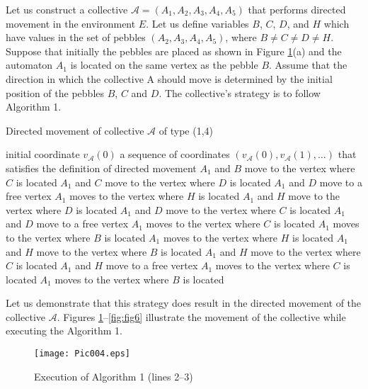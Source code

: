 \documentclass{article}
\newenvironment{proof}[1][Proof]{\begin{trivlist}
\item[\hskip \labelsep {\bfseries #1}]}{\end{trivlist}}
\begin{document}
\begin{proof}
Let us construct a collective $\mathcal{A} = \left( A_{1}, A_{2}, A_{3}, A_{4}, A_{5} \right)$ that performs directed movement in the environment $E$.
Let us define variables $B$, $C$, $D$, and $H$ which have values in the set of pebbles $\left( A_{2}, A_{3}, A_{4}, A_{5} \right)$, where $B \neq C \neq D \neq H$.
Suppose that initially the pebbles are placed as shown in Figure \ref{fig:fig4}(a) and the automaton $A_{1}$ is located on the same vertex as the pebble $B$. 
Assume that the direction in which the collective A should move is determined by the initial position of the pebbles $B$, $C$ and $D$. 
The collective's strategy is to follow Algorithm 1.

\begin{algorithm}
\caption{Directed movement of collective $\mathcal{A}$ of type (1,4)}
\begin{algorithmic}[1]
\Require initial coordinate $v_{\mathcal{A}}(0)$
\Ensure a sequence of coordinates $\left( v_{\mathcal{A}}(0), v_{\mathcal{A}}(1), \dots \right)$ that satisfies the definition of directed movement
\Statex
\Loop
\State $A_{1}$ and $B$ move to the vertex where $C$ is located
\State $A_{1}$ and $C$ move to the vertex where $D$ is located
\State $A_{1}$ and $D$ move to a free vertex
\State $A_{1}$ moves to the vertex where $H$ is located
\State $A_{1}$ and $H$ move to the vertex where $D$ is located
\State $A_{1}$ and $D$ move to the vertex where $C$ is located
\State $A_{1}$ and $D$ move to a free vertex
\Else
\State $A_{1}$ moves to the vertex where $C$ is located
\State $A_{1}$ moves to the vertex where $B$ is located
\State $A_{1}$ moves to the vertex where $H$ is located
\State $A_{1}$ and $H$ move to the vertex where $B$ is located
\State $A_{1}$ and $H$ move to the vertex where $C$ is located
\State $A_{1}$ and $H$ move to a free vertex
\EndIf
\State $A_{1}$ moves to the vertex where $C$ is located
\State $A_{1}$ moves to the vertex where $B$ is located
\EndLoop
\end{algorithmic}
\end{algorithm}

Let us demonstrate that this strategy does result in the directed movement of the collective $\mathcal{A}$. 
Figures \ref{fig:fig4}--\ref{fig:fig6} illustrate the movement of the collective while executing the Algorithm 1.

\begin{figure}[h]
	\centering
	\texttt{[image: Pic004.eps]}
	\caption{Execution of Algorithm 1 (lines 2--3)}
	\label{fig:fig4}
\end{figure}


\end{proof}
\end{document}
